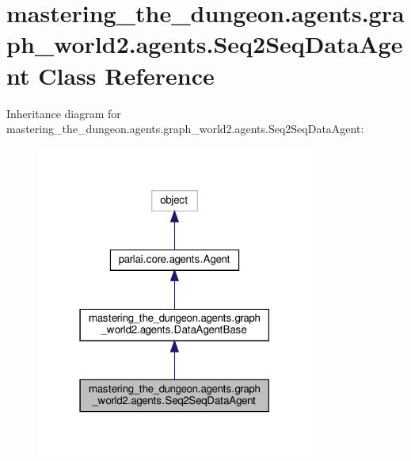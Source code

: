 \hypertarget{classmastering__the__dungeon_1_1agents_1_1graph__world2_1_1agents_1_1Seq2SeqDataAgent}{}\section{mastering\+\_\+the\+\_\+dungeon.\+agents.\+graph\+\_\+world2.\+agents.\+Seq2\+Seq\+Data\+Agent Class Reference}
\label{classmastering__the__dungeon_1_1agents_1_1graph__world2_1_1agents_1_1Seq2SeqDataAgent}


Inheritance diagram for mastering\+\_\+the\+\_\+dungeon.\+agents.\+graph\+\_\+world2.\+agents.\+Seq2\+Seq\+Data\+Agent\+:
\nopagebreak
\begin{figure}[H]
\begin{center}
\leavevmode
\includegraphics[width=259pt]{classmastering__the__dungeon_1_1agents_1_1graph__world2_1_1agents_1_1Seq2SeqDataAgent__inherit__graph}
\end{center}
\end{figure}


